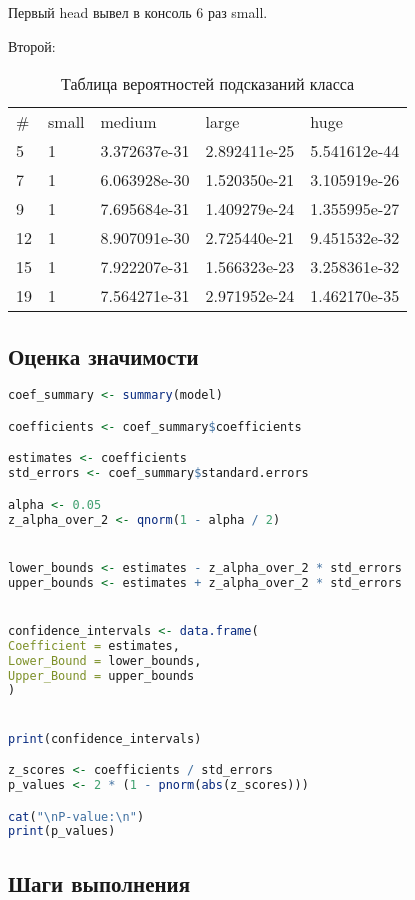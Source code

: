 Первый head вывел в консоль 6 раз small.
\newline

\newpage
Второй:
\begin{table}[h]
	\centering
	\caption{Таблица вероятностей подсказаний класса}
	\begin{tabular}{lllll}
		\# & small & medium & large & huge \\
		5 & 1 & 3.372637e-31 & 2.892411e-25 & 5.541612e-44 \\
		7 & 1 & 6.063928e-30 & 1.520350e-21 & 3.105919e-26 \\
		9 & 1 & 7.695684e-31 & 1.409279e-24 & 1.355995e-27 \\
		12 & 1 & 8.907091e-30 & 2.725440e-21 & 9.451532e-32 \\
		15 & 1 & 7.922207e-31 & 1.566323e-23 & 3.258361e-32 \\
		19 & 1 & 7.564271e-31 & 2.971952e-24 & 1.462170e-35 \\
	\end{tabular}
\end{table}




\subsection{Оценка значимости}
\begin{lstlisting}[language=R, caption={Формирование метрик значимости}]
coef_summary <- summary(model)

coefficients <- coef_summary$coefficients

estimates <- coefficients
std_errors <- coef_summary$standard.errors

alpha <- 0.05
z_alpha_over_2 <- qnorm(1 - alpha / 2) 


lower_bounds <- estimates - z_alpha_over_2 * std_errors
upper_bounds <- estimates + z_alpha_over_2 * std_errors


confidence_intervals <- data.frame(
Coefficient = estimates,
Lower_Bound = lower_bounds,
Upper_Bound = upper_bounds
)


print(confidence_intervals)

z_scores <- coefficients / std_errors
p_values <- 2 * (1 - pnorm(abs(z_scores)))

cat("\nP-value:\n")
print(p_values)
\end{lstlisting}
\subsection*{Шаги выполнения}

